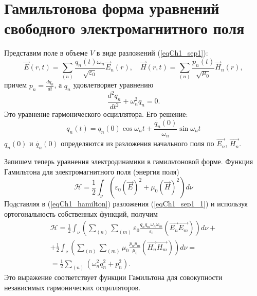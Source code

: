 \section{Гамильтонова форма уравнений свободного электромагнитного поля}
Представим поле в объеме  $V$  в виде разложений (\ref{eqCh1_sep1}):
\begin{equation}
\vec{E}\left(r, t\right) = \sum_{(n)}
\frac{q_n\left(t\right) \omega_n}{\sqrt{\varepsilon_0}} \vec{E}_n\left(r\right),
\quad
\vec{H}\left(r, t\right) = \sum_{(n)}
\frac{p_n\left(t\right)}{\sqrt{\mu_0}} \vec{H}_n\left(r\right),
\label{eqCh1_sep1_1}
\end{equation}
причем $p_n = \frac{d q_n}{d t}$, а $q_n$ удовлетворяет уравнению
\[
\frac{d^2 q_n}{d t^2} + \omega_n^2 q_n = 0.
\]
Это уравнение гармонического осциллятора. Его решение:
\begin{equation}
q_n\left(t\right) = q_n\left(0\right) \cos \omega_n t + 
\frac{\dot{q_n}\left(0\right)}{\omega_n} \sin \omega_n t 
\end{equation}
$q_n\left(0\right)$ и 
$\dot{q_n}\left(0\right)$ 
определяются из разложения начального поля по  
$\vec{E_n}$, $\vec{H_n}$.
 
Запишем теперь уравнения электродинамики в гамильтоновой
форме. Функция Гамильтона для электромагнитного поля 
(энергия поля)
\begin{equation}
\mathcal{H} = \frac{1}{2}
\int_{\nu}\left( \varepsilon_0\left(\vec{E}\right)^2 + \mu_0
\left(\vec{H}\right)^2\right) d\nu
\label{eqCh1_hamilton}
\end{equation}
Подставляя в (\ref{eqCh1_hamilton}) разложения (\ref{eqCh1_sep1_1}) и
используя ортогональность собственных функций, получим 
\begin{eqnarray}
\mathcal{H} = \frac{1}{2} 
\int_{\nu}\left( \sum_{(n)} \sum_{(m)}\varepsilon_0
\frac{q_n q_m \omega_n \omega_m}{\varepsilon_0}
\left( \vec{E_n} \vec{E_m}\right)
\right) d\nu +
\nonumber \\
+  \frac{1}{2} 
\int_{\nu}\left( \sum_{(n)} \sum_{(m)}\mu_0
\frac{p_n p_m}{\mu_0}
\left( \vec{H_n} \vec{H_m}\right)
\right) d\nu =
\nonumber \\
= \frac{1}{2}\sum_{(n)}\left(\omega_n^2 q_n^2 + p_n^2\right).
\end{eqnarray}
Это выражение соответствует функции Гамильтона для совокупности
независимых гармонических осцилляторов. 


